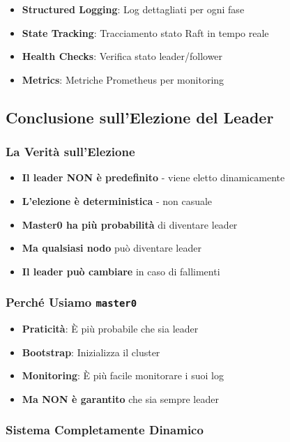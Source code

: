 \documentclass[12pt,a4paper]{article}
\begin{document}
\begin{itemize}
\item \textbf{Structured Logging}: Log dettagliati per ogni fase
\item \textbf{State Tracking}: Tracciamento stato Raft in tempo reale
\item \textbf{Health Checks}: Verifica stato leader/follower
\item \textbf{Metrics}: Metriche Prometheus per monitoring
\end{itemize}

\subsection{Conclusione sull'Elezione del Leader}

\subsubsection{La Verità sull'Elezione}

\begin{itemize}
\item \textbf{Il leader NON è predefinito} - viene eletto dinamicamente
\item \textbf{L'elezione è deterministica} - non casuale
\item \textbf{Master0 ha più probabilità} di diventare leader
\item \textbf{Ma qualsiasi nodo} può diventare leader
\item \textbf{Il leader può cambiare} in caso di fallimenti
\end{itemize}

\subsubsection{Perché Usiamo \texttt{master0}}

\begin{itemize}
\item \textbf{Praticità}: È più probabile che sia leader
\item \textbf{Bootstrap}: Inizializza il cluster
\item \textbf{Monitoring}: È più facile monitorare i suoi log
\item \textbf{Ma NON è garantito} che sia sempre leader
\end{itemize}

\subsubsection{Sistema Completamente Dinamico}
\end{document}
